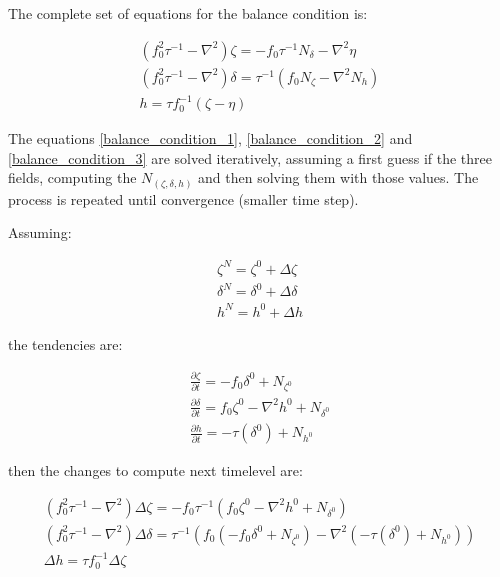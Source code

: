 The complete set of equations for the balance condition is:

\begin{gather}
  \label{balance_condition_1}
  \left(f_0^2 \tau^{-1} - \nabla^2\right) \zeta =
      -f_0\tau^{-1} N_{\delta} - \nabla^2 \eta \\
  \label{balance_condition_2}
  \left(f_0^2 \tau^{-1} - \nabla^2\right) \delta =
      \tau^{-1}\left(f_0 N_{\zeta} - \nabla^2 N_h \right) \\
  \label{balance_condition_3}
  h = \tau f_0^{-1}\left(\zeta - \eta\right)
\end{gather}

The equations \ref{balance_condition_1}, \ref{balance_condition_2} and
\ref{balance_condition_3} are solved iteratively, assuming a first guess if
the three fields, computing the $N_{(\zeta,\delta,h)}$ and then solving
them with those values. The process is repeated until convergence (smaller
time step).

Assuming:

\begin{gather}
  \zeta^N = \zeta^0 + \Delta \zeta \\
  \delta^N = \delta^0 + \Delta \delta \\
  h^N = h^0 + \Delta h
\end{gather}

the tendencies are:

\begin{gather}
  \frac{\partial \zeta}{\partial t} = -f_0 \delta^0 + N_{\zeta^0} \\
  \frac{\partial \delta}{\partial t} = f_0 \zeta^0 -
     \nabla^2 h^0 + N_{\delta^0} \\
  \frac{\partial h}{\partial t} = -\tau(\delta^0) + N_{h^0}
\end{gather}

then the changes to compute next timelevel are:

\begin{gather}
  \label{nextlev1}
  \left(f_0^2\tau^{-1}-\nabla^2\right) \Delta\zeta =
  -f_0 \tau^{-1} \left(f_0 \zeta^0-\nabla^2 h^0 + N_{\delta^0} \right) \\
  \label{nextlev2}
  \left(f_0^2\tau^{-1}-\nabla^2\right) \Delta\delta =
  \tau^{-1} \left(f_0 (-f_0 \delta^0 + N_{\zeta^0}) -
  \nabla^2(-\tau(\delta^0) + N_{h^0})\right) \\
  \label{nextlev3}
  \Delta h = \tau f_0^{-1} \Delta \zeta
\end{gather}

